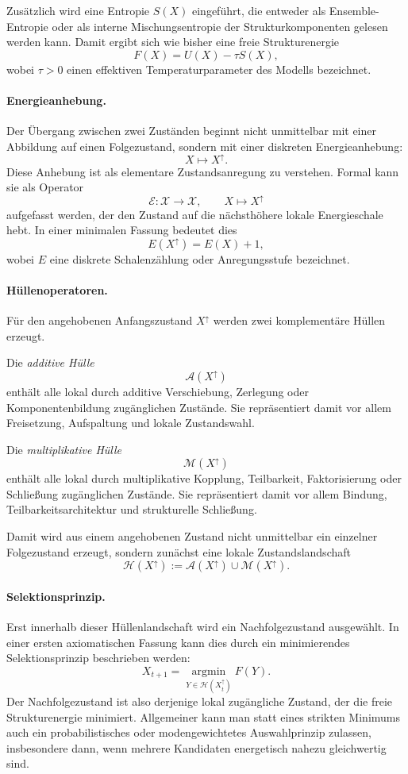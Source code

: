 \documentclass[11pt,a4paper]{article}
\theoremstyle{definition}
\begin{document}
Zusätzlich wird eine Entropie \(S(X)\) eingeführt, die entweder als Ensemble-Entropie oder als interne Mischungsentropie der Strukturkomponenten gelesen werden kann. Damit ergibt sich wie bisher eine freie Strukturenergie
\[
F(X)=U(X)-\tau S(X),
\]
wobei \(\tau>0\) einen effektiven Temperaturparameter des Modells bezeichnet.

\paragraph{Energieanhebung.}
Der Übergang zwischen zwei Zuständen beginnt nicht unmittelbar mit einer Abbildung auf einen Folgezustand, sondern mit einer diskreten Energieanhebung:
\[
X \longmapsto X^\uparrow.
\]
Diese Anhebung ist als elementare Zustandsanregung zu verstehen. Formal kann sie als Operator
\[
\mathcal E:\mathcal X\to\mathcal X,\qquad X\mapsto X^\uparrow
\]
aufgefasst werden, der den Zustand auf die nächsthöhere lokale Energieschale hebt. In einer minimalen Fassung bedeutet dies
\[
E(X^\uparrow)=E(X)+1,
\]
wobei \(E\) eine diskrete Schalenzählung oder Anregungsstufe bezeichnet.

\paragraph{Hüllenoperatoren.}
Für den angehobenen Anfangszustand \(X^\uparrow\) werden zwei komplementäre Hüllen erzeugt.

Die \emph{additive Hülle}
\[
\mathcal A(X^\uparrow)
\]
enthält alle lokal durch additive Verschiebung, Zerlegung oder Komponentenbildung zugänglichen Zustände. Sie repräsentiert damit vor allem Freisetzung, Aufspaltung und lokale Zustandswahl.

Die \emph{multiplikative Hülle}
\[
\mathcal M(X^\uparrow)
\]
enthält alle lokal durch multiplikative Kopplung, Teilbarkeit, Faktorisierung oder Schließung zugänglichen Zustände. Sie repräsentiert damit vor allem Bindung, Teilbarkeitsarchitektur und strukturelle Schließung.

Damit wird aus einem angehobenen Zustand nicht unmittelbar ein einzelner Folgezustand erzeugt, sondern zunächst eine lokale Zustandslandschaft
\[
\mathcal H(X^\uparrow):=\mathcal A(X^\uparrow)\cup\mathcal M(X^\uparrow).
\]

\paragraph{Selektionsprinzip.}
Erst innerhalb dieser Hüllenlandschaft wird ein Nachfolgezustand ausgewählt. In einer ersten axiomatischen Fassung kann dies durch ein minimierendes Selektionsprinzip beschrieben werden:
\[
X_{t+1}
=
\operatorname*{argmin}_{Y\in \mathcal H(X_t^\uparrow)}F(Y).
\]
Der Nachfolgezustand ist also derjenige lokal zugängliche Zustand, der die freie Strukturenergie minimiert. Allgemeiner kann man statt eines strikten Minimums auch ein probabilistisches oder modengewichtetes Auswahlprinzip zulassen, insbesondere dann, wenn mehrere Kandidaten energetisch nahezu gleichwertig sind.
\end{document}

